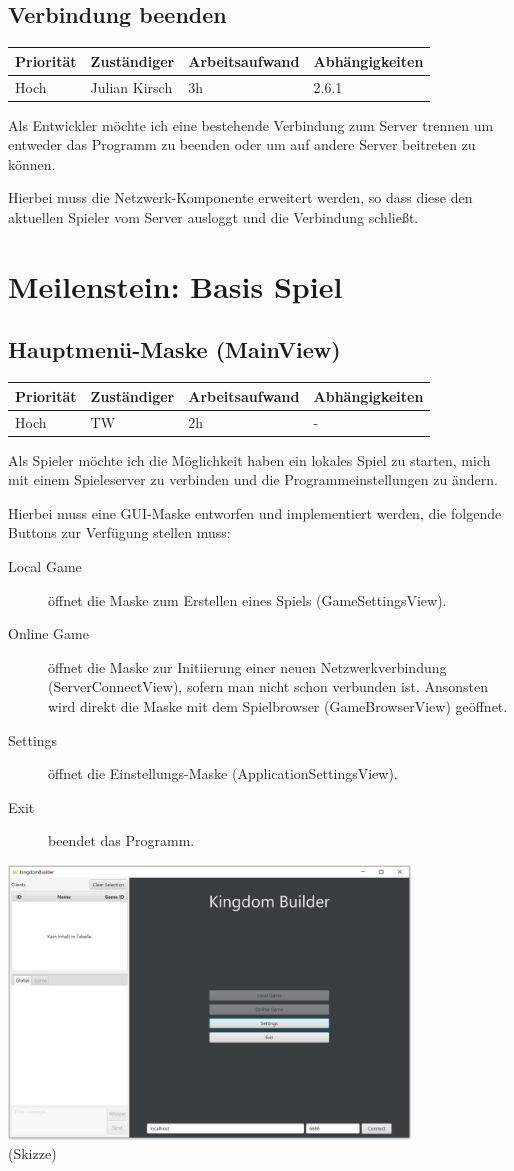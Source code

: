 \documentclass[a4paper]{scrreprt}
\newenvironment{requirement}[5] {
	\subsection{#1}
	\begin{tabularx}{\textwidth}{|X|l|X|X|}
		\hline
		Priorität & Zuständiger & Arbeitsaufwand & Abhängigkeiten \\
		\hline
		#2 & #3 & #4 & #5 \\
		\hline
	\end{tabularx}
	}{
	\newpage
	}
\begin{document}
\begin{requirement}{Verbindung beenden}{Hoch}{Julian Kirsch}{3h}{2.6.1}

\begin{center}
	Als Entwickler möchte ich eine bestehende Verbindung zum Server trennen um entweder das Programm zu beenden oder um auf andere Server beitreten zu können.
\end{center}

Hierbei muss die Netzwerk-Komponente erweitert werden, so dass diese den aktuellen Spieler vom Server ausloggt und die Verbindung schließt.

\end{requirement}


\section{Meilenstein: Basis Spiel}


\begin{requirement}{Hauptmenü-Maske (MainView)}{Hoch}{TW}{2h}{-}

\begin{center}
	Als Spieler möchte ich die Möglichkeit haben ein lokales Spiel zu starten, mich mit einem Spieleserver zu verbinden und die Programmeinstellungen zu ändern.
\end{center}


Hierbei muss eine GUI-Maske entworfen und implementiert werden, die folgende Buttons zur Verfügung stellen muss:
\begin{description}
	\item[Local Game] öffnet die Maske zum Erstellen eines Spiels (\glqq GameSettingsView\grqq{}).
	\item[Online Game] öffnet die Maske zur Initiierung einer neuen Netzwerkverbindung (\glqq ServerConnectView\grqq{}), sofern man nicht schon verbunden ist.
				Ansonsten wird direkt die Maske mit dem Spielbrowser (\glqq GameBrowserView\grqq{}) geöffnet.
	\item[Settings] öffnet die Einstellungs-Maske (\glqq ApplicationSettingsView\grqq{}).
	\item[Exit] beendet das Programm.
\end{description}

\begin{center}
	\includegraphics[width=0.8\textwidth]{view2.png}
	\\
	\tiny{(Skizze)}
\end{center}

\end{requirement}
\end{document}
